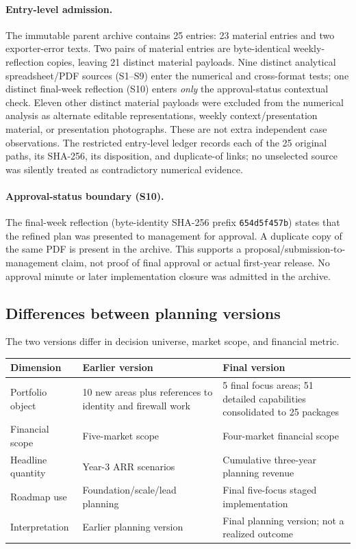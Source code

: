 \paragraph{Entry-level admission.} The immutable parent archive contains 25 entries: 23 material entries and two exporter-error texts. Two pairs of material entries are byte-identical weekly-reflection copies, leaving 21 distinct material payloads. Nine distinct analytical spreadsheet/PDF sources (S1--S9) enter the numerical and cross-format tests; one distinct final-week reflection (S10) enters \emph{only} the approval-status contextual check. Eleven other distinct material payloads were excluded from the numerical analysis as alternate editable representations, weekly context/presentation material, or presentation photographs. These are not extra independent case observations. The restricted entry-level ledger records each of the 25 original paths, its SHA-256, its disposition, and duplicate-of links; no unselected source was silently treated as contradictory numerical evidence.

\paragraph{Approval-status boundary (S10).} The final-week reflection (byte-identity SHA-256 prefix \texttt{654d5f457b}) states that the refined plan was presented to management for approval. A duplicate copy of the same PDF is present in the archive. This supports a proposal/submission-to-management claim, not proof of final approval or actual first-year release. No approval minute or later implementation closure was admitted in the archive.


\subsection{Differences between planning versions}\label{app:versions}
The two versions differ in decision universe, market scope, and financial metric.

\begin{center}
\label{tab:app-version-diff}
\begin{tabularx}{\linewidth}{p{3.0cm} X X}
\toprule
Dimension & Earlier version & Final version \\
\midrule
Portfolio object & 10 new areas plus references to identity and firewall work & 5 final focus areas; 51 detailed capabilities consolidated to 25 packages \\
Financial scope & Five-market scope & Four-market financial scope \\
Headline quantity & Year-3 ARR scenarios & Cumulative three-year planning revenue \\
Roadmap use & Foundation/scale/lead planning & Final five-focus staged implementation \\
Interpretation & Earlier planning version & Final planning version; not a realized outcome \\
\bottomrule
\end{tabularx}
\end{center}


